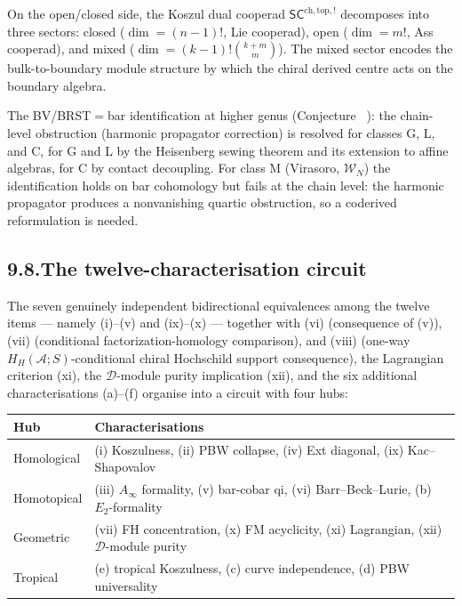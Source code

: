 \documentclass[11pt,reqno]{amsart}
\makeatletter
\theoremstyle{definition}
\theoremstyle{remark}
\providecommand{\cA}{\mathcal{A}}
\providecommand{\cD}{\mathcal{D}}
\numberwithin{equation}{section}
\let\svy@oldref\ref
\renewcommand{\ref}[1]{%
 \@ifundefined{r@#1}{\textit{full monograph}}{\svy@oldref{#1}}%
}
\makeatother
\begin{document}
On the open/closed side, the Koszul dual cooperad
$\mathsf{SC}^{\mathrm{ch,top},!}$ decomposes into three sectors:
closed ($\dim=(n-1)!$, Lie cooperad), open ($\dim=m!$, Ass cooperad),
and mixed ($\dim=(k-1)!\binom{k+m}{m}$). The mixed sector
encodes the bulk-to-boundary module structure by which the chiral
derived centre acts on the boundary algebra.

The BV/BRST${}={}$bar identification at higher genus
(Conjecture~\ref{conj:master-bv-brst}): the chain-level obstruction
(harmonic propagator correction) is resolved for classes G, L, and C,
for G and L by the Heisenberg sewing theorem and its extension to
affine algebras, for C by contact decoupling. For class M (Virasoro,
$\mathcal W_N$) the identification holds on bar cohomology but fails
at the chain level: the harmonic propagator produces a nonvanishing
quartic obstruction, so a coderived reformulation is needed.

\subsection*{9.8.\enspace The twelve-characterisation circuit}

The seven genuinely independent bidirectional equivalences among
the twelve items --- namely \textup{(i)--(v)} and
\textup{(ix)--(x)} --- together with \textup{(vi)}
(consequence of \textup{(v)}), \textup{(vii)} (conditional
factorization-homology comparison), and \textup{(viii)} (one-way
$H_H(\cA;S)$-conditional chiral Hochschild support consequence), the Lagrangian
criterion (xi), the $\cD$-module purity implication (xii), and the six
additional characterisations (a)--(f) organise into a circuit with
four hubs:

\begin{center}
\small
\begin{tabular}{ll}
\textbf{Hub} & \textbf{Characterisations}\\ \hline
Homological & (i) Koszulness, (ii) PBW collapse,
(iv) Ext diagonal, (ix) Kac--Shapovalov\\
Homotopical & (iii) $A_\infty$ formality,
(v) bar-cobar qi, (vi) Barr--Beck--Lurie, (b) $E_2$-formality\\
Geometric & (vii) FH concentration, (x) FM acyclicity,
(xi) Lagrangian, (xii) $\cD$-module purity\\
Tropical & (e) tropical Koszulness, (c) curve independence,
(d) PBW universality\\
\end{tabular}
\end{center}
\end{document}
